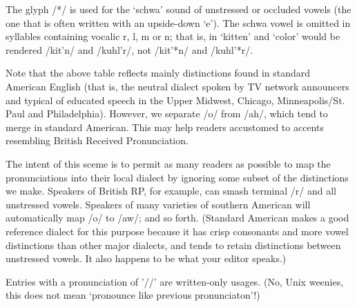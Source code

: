 The glyph /*/ is used for the `schwa' sound of unstressed or occluded vowels
(the one that is often written with an upside-down `e'). The schwa vowel is
omitted in syllables containing vocalic r, l, m or n; that is, in `kitten' and
`color' would be rendered /kit'n/ and /kuhl'r/, not /kit'*n/ and /kuhl'*r/.

Note that the above table reflects mainly distinctions found in standard
American English (that is, the neutral dialect spoken by TV network announcers
and typical of educated speech in the Upper Midwest, Chicago, Minneapolis/St.
Paul and Philadelphia). However, we separate /o/ from /ah/, which tend to merge
in standard American. This may help readers accustomed to accents resembling
British Received Pronunciation.

The intent of this sceme is to permit as many readers as possible to map the
pronunciations into their local dialect by ignoring some subset of the
distinctions we make. Speakers of British RP, for example, can smash terminal
/r/ and all unstressed vowels. Speakers of many varieties of southern American
will automatically map /o/ to /aw/; and so forth. (Standard American makes a
good reference dialect for this purpose because it has crisp consonants and
more vowel distinctions than other major dialects, and tends to retain
distinctions between unstressed vowels. It also happens to be what your editor
speaks.)

Entries with a pronunciation of '//' are written-only usages. (No, Unix
weenies, this does not mean `pronounce like previous pronunciaton'!)

